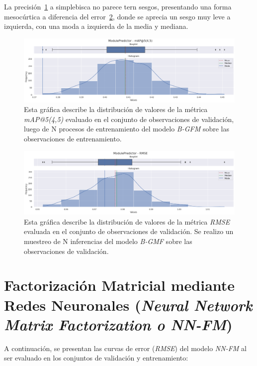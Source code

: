 \documentclass[11pt,a4paper,twoside]{thesis}
\begin{document}
La precisión~\ref{fig:bGmfMap} a simplebisca no parece tern sesgos, presentando
una forma mesocúrtica a diferencia del error~\ref{fig:bGmfRMSE}, donde se
aprecia un sesgo muy leve a izquierda, con una moda a izquierda de la media y
mediana.

\begin{figure}[h!]
	\centering
	\includegraphics[width=15cm]{./images/metrics-BGFM-mapk.png}
	\caption{
		Esta gráfica describe la distribución de valores de la métrica
		\textit{mAP@5(4,5)} evaluado en el conjunto de observaciones de
		validación, luego de N procesos de entrenamiento del modelo
		\textit{B-GFM} sobre las observaciones de entrenamiento.
	}
	\label{fig:bGmfMap}
\end{figure}

\clearpage

\begin{figure}[h!]
	\centering
	\includegraphics[width=15cm]{./images/metrics-BGFM-RMSE.png}
	\caption{
		Esta gráfica describe la distribución de valores de la métrica
		\textit{RMSE} evaluada en el conjunto de observaciones de
		validación. Se realizo un muestreo de N inferencias del modelo
		\textit{B-GMF} sobre las observaciones
		de validación.
	}
	\label{fig:bGmfRMSE}
\end{figure}

\section{Factorización Matricial mediante Redes Neuronales
  (\textit{Neural Network Matrix Factorization o NN-FM})}

A continuación, se presentan las curvas de error (\textit{RMSE}) del modelo
\textit{NN-FM} al ser evaluado en los conjuntos de validación y entrenamiento:
\end{document}
